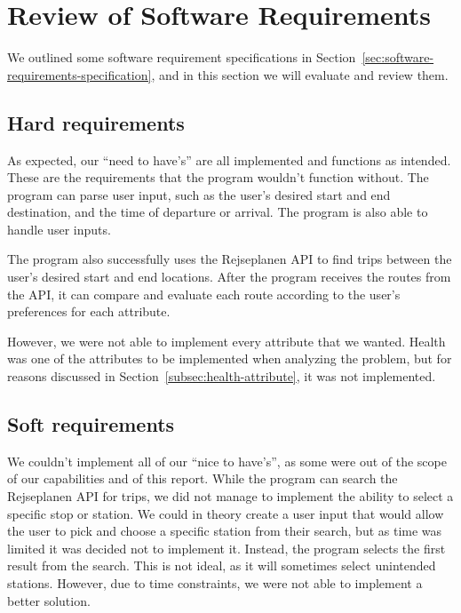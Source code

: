 \section{Review of Software Requirements}\label{sec:review-of-software-requirements}

We outlined some software requirement specifications in Section~\ref{sec:software-requirements-specification},
and in this section we will evaluate and review them.

\subsection{Hard requirements}\label{subsec:functional-requirements}

As expected, our ``need to have's'' are all implemented and functions as intended.
These are the requirements that the program wouldn't function without.
The program can parse user input, such as the user's desired start and end destination, and the time of departure or
arrival.
The program is also able to handle user inputs.

The program also successfully uses the Rejseplanen API to find trips between the user's desired start and end locations.
After the program receives the routes from the API, it can compare and evaluate each route according to the user's
preferences for each attribute.

However, we were not able to implement every attribute that we wanted.
Health was one of the attributes to be implemented when analyzing the problem, but for reasons discussed in
Section~\ref{subsec:health-attribute}, it was not implemented.

\subsection{Soft requirements}\label{subsec:non-functional-requirements}

We couldn't implement all of our ``nice to have's'', as some were out of the scope of our capabilities and of this
report.
While the program can search the Rejseplanen API for trips, we did not manage to implement the ability to select a
specific stop or station.
We could in theory create a user input that would allow the user to pick and choose a specific station from their
search, but as time was limited it was decided not to implement it.
Instead, the program selects the first result from the search.
This is not ideal, as it will sometimes select unintended stations.
However, due to time constraints, we were not able to implement a better solution.

